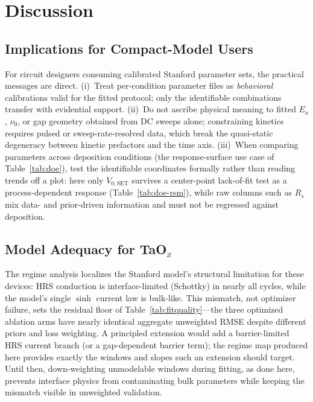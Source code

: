 \documentclass[journal]{IEEEtran}
\begin{document}
\section{Discussion}
\label{sec:discussion}

\subsection{Implications for Compact-Model Users}

For circuit designers consuming calibrated Stanford parameter sets, the
practical messages are direct.  (i)~Treat per-condition parameter files as
\emph{behavioral} calibrations valid for the fitted protocol; only the
identifiable combinations transfer with evidential support.  (ii)~Do not
ascribe physical meaning to fitted $E_a$, $\nu_0$, or gap geometry obtained
from DC sweeps alone; constraining kinetics requires pulsed or
sweep-rate-resolved data, which break the quasi-static degeneracy between
kinetic prefactors and the time axis.  (iii)~When comparing parameters
across deposition conditions (the response-surface use case of
Table~\ref{tab:doe}), test the identifiable coordinates formally rather than
reading trends off a plot: here only $V_{0,\mathrm{SET}}$ survives a
center-point lack-of-fit test as a process-dependent response
(Table~\ref{tab:doe-rsm}), while raw columns such as $R_s$ mix data- and
prior-driven information and must not be regressed against deposition.

\subsection{Model Adequacy for TaO$_x$}

The regime analysis localizes the Stanford model's structural limitation for
these devices: HRS conduction is interface-limited (Schottky) in nearly all
cycles, while the model's single $\sinh$ current law is bulk-like.  This
mismatch, not optimizer failure, sets the residual floor of
Table~\ref{tab:fitquality}---the three optimized ablation arms have nearly
identical aggregate unweighted RMSE despite different priors and loss
weighting.  A principled
extension would add a barrier-limited HRS current branch (or a
gap-dependent barrier term); the regime map produced here provides exactly
the windows and slopes such an extension should target.  Until then,
down-weighting unmodelable windows during fitting, as done here, prevents
interface physics from contaminating bulk parameters while keeping the
mismatch visible in unweighted validation.
\end{document}
